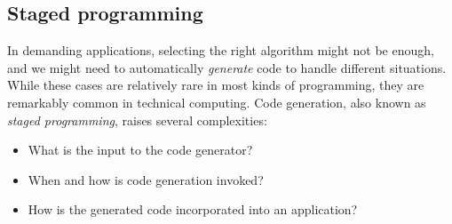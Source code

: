 




\subsection{Staged programming}

In demanding applications, selecting the right algorithm might not
be enough, and we might need to automatically \emph{generate} code
to handle different situations. While these cases are relatively rare
in most kinds of programming, they are remarkably common in technical
computing. Code generation, also known as \emph{staged programming},
raises several complexities:

\vspace{-3ex}
\begin{singlespace}
\begin{itemize}
\item What is the input to the code generator?
\item When and how is code generation invoked?
\item How is the generated code incorporated into an application?
\end{itemize}
\end{singlespace}

